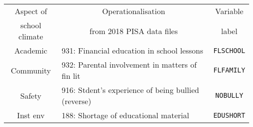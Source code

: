 \begin{table}
  \centering
    \begin{tabular}{clc}
    \toprule
    Aspect of      & \multicolumn{1}{c}{Operationalisation} & Variable \\
    school climate & \multicolumn{1}{c}{from 2018 PISA data files} & label \\
    \midrule
    Academic & 931: Financial education in school lessons & \texttt{FLSCHOOL} \\
    Community & 932: Parental involvement in matters of fin lit & \texttt{FLFAMILY} \\
    Safety & 916: Stdent's experience of being bullied (reverse) & \texttt{NOBULLY} \\
    Inst env & 188: Shortage of educational material & \texttt{EDUSHORT} \\
    \bottomrule
    \end{tabular}
\end{table}
